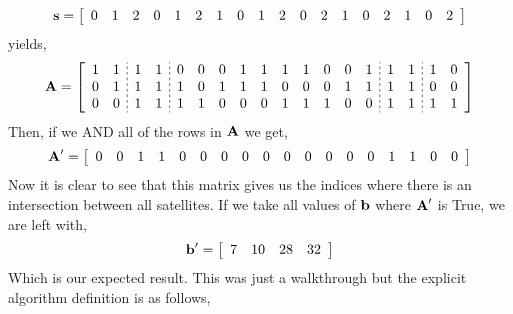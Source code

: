 \begin{equation*} 
    \bm{\mathrm{s}} = 
    \left[
    \begin{array}{cccccccccccccccccc}
	0 & 1 & 2 & 0 & 1 & 2 & 1 & 0 & 1 & 2 & 0 & 2 & 1 & 0 & 2 & 1 & 0 & 2 \\
    \end{array}
    \right]
\end{equation*}
yields,
\begin{equation*} 
    \se{A} = 
    \left[
	\begin{array}{cc;{2pt/2pt}cc;{2pt/2pt}cccccccccc;{2pt/2pt}cc;{2pt/2pt}cc}
	1 & 1 & 1 & 1 & 0 & 0 & 0 & 1 & 1 & 1 & 1 & 0 & 0 & 1 & 1 & 1 & 1 & 0 \\
	0 & 1 & 1 & 1 & 1 & 0 & 1 & 1 & 1 & 0 & 0 & 0 & 1 & 1 & 1 & 1 & 0 & 0 \\
	0 & 0 & 1 & 1 & 1 & 1 & 0 & 0 & 0 & 1 & 1 & 1 & 0 & 0 & 1 & 1 & 1 & 1 \\
    \end{array}
    \right]
\end{equation*}
Then, if we AND all of the rows in $\bm{\mathrm{A}}$ we get,
\begin{equation*} 
    \bm{\mathrm{A}}' = 
    \left[
    \begin{array}{cccccccccccccccccc}
	0 & 0 & 1 & 1 & 0 & 0 & 0 & 0 & 0 & 0 & 0 & 0 & 0 & 0 & 1 & 1 & 0 & 0 \\
    \end{array}
    \right]
\end{equation*}
Now it is clear to see that this matrix gives us the indices where there is an
intersection between all satellites. If we take all values of $\bm{\mathrm{b}}$ where
$\bm{\mathrm{A}}'$ is True, we are left with,
\begin{equation*} 
    \bm{\mathrm{b}}' = 
    \left[
    \begin{array}{cccccccccccccccccc}
	7 & 10 & 28 & 32
    \end{array}
    \right]
\end{equation*}
Which is our expected result. This was just a walkthrough but the explicit
algorithm definition is as follows,

